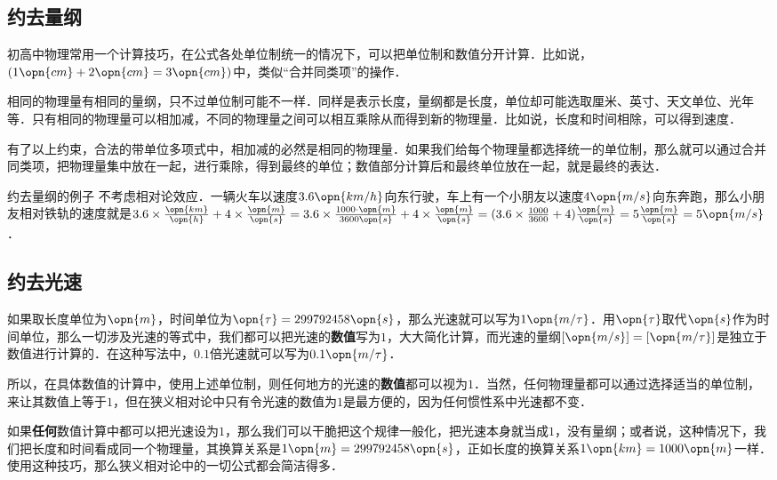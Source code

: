 
\subsection{约去量纲}

初高中物理常用一个计算技巧，在公式各处单位制统一的情况下，可以把单位制和数值分开计算．比如说，$(1\opn{cm}+2\opn{cm}=3\opn{cm})$中，类似“合并同类项”的操作．

相同的物理量有相同的量纲，只不过单位制可能不一样．同样是表示长度，量纲都是长度，单位却可能选取厘米、英寸、天文单位、光年等．只有相同的物理量可以相加减，不同的物理量之间可以相互乘除从而得到新的物理量．比如说，长度和时间相除，可以得到速度．

有了以上约束，合法的带单位多项式中，相加减的必然是相同的物理量．如果我们给每个物理量都选择统一的单位制，那么就可以通过合并同类项，把物理量集中放在一起，进行乘除，得到最终的单位；数值部分计算后和最终单位放在一起，就是最终的表达．

\begin{example}{约去量纲的例子}
不考虑相对论效应．一辆火车以速度$3.6\opn{km/h}$向东行驶，车上有一个小朋友以速度$4\opn{m/s}$向东奔跑，那么小朋友相对铁轨的速度就是$3.6\times\frac{\opn{km}}{\opn{h}}+4\times\frac{\opn{m}}{\opn{s}}=3.6\times\frac{1000\cdot \opn{m}}{3600\opn{s}}+4\times\frac{\opn{m}}{\opn{s}}=(3.6\times\frac{1000}{3600}+4)\frac{\opn{m}}{\opn{s}}=5\frac{\opn{m}}{\opn{s}}=5\opn{m/s}$．
\end{example}

\subsection{约去光速}

如果取长度单位为$\opn{m}$，时间单位为$\opn{\tau}=299792458\opn{s}$，那么光速就可以写为$1\opn{m/\tau}$．用$\opn{\tau}$取代$\opn{s}$作为时间单位，那么一切涉及光速的等式中，我们都可以把光速的\textbf{数值}写为$1$，大大简化计算，而光速的量纲$[\opn{m/s}]=[\opn{m/\tau}]$是独立于数值进行计算的．在这种写法中，$0.1$倍光速就可以写为$0.1\opn{m/\tau}$．

所以，在具体数值的计算中，使用上述单位制，则任何地方的光速的\textbf{数值}都可以视为$1$．当然，任何物理量都可以通过选择适当的单位制，来让其数值上等于$1$，但在狭义相对论中只有令光速的数值为$1$是最方便的，因为任何惯性系中光速都不变．

如果\textbf{任何}数值计算中都可以把光速设为$1$，那么我们可以干脆把这个规律一般化，把光速本身就当成$1$，没有量纲；或者说，这种情况下，我们把长度和时间看成同一个物理量，其换算关系是$1\opn{m}=299792458\opn{s}$，正如长度的换算关系$1\opn{km}=1000\opn{m}$一样．使用这种技巧，那么狭义相对论中的一切公式都会简洁得多．




